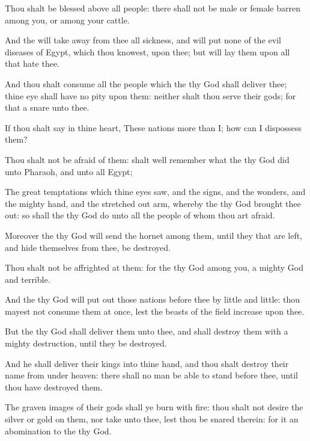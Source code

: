 {Thou shalt be
blessed above all
people: there shall not be
male or female
barren among you, or among your
cattle.

And the
{} will take
away from thee all
sickness, and will
put none of the
evil
diseases of
Egypt, which thou
knowest, upon thee; but will
lay them upon all
{} that
hate thee.

And thou shalt
consume all the
people which the
{} thy
God shall
deliver thee; thine
eye shall have no
pity upon them: neither shalt thou
serve their
gods; for that
{} a
snare unto thee.

If thou shalt
say in thine
heart, These
nations
{}
more than I;
how
can I
dispossess them?

Thou shalt not be
afraid of them:
{} shalt
well
remember what the
{} thy
God
did unto
Pharaoh, and unto all
Egypt;

The
great
temptations which thine
eyes
saw, and the
signs, and the
wonders, and the
mighty
hand, and the stretched
out
arm, whereby the
{} thy
God brought thee
out: so shall the
{} thy
God
do unto all the
people of whom thou art
afraid.

Moreover the
{} thy
God will
send the
hornet among them, until they that are
left, and
hide themselves
from thee, be
destroyed.

Thou shalt not be
affrighted
at them: for the
{} thy
God
{}
among you, a
mighty
God and
terrible.

And the
{} thy
God will put
out
those
nations
before thee by
little and
little: thou
mayest not
consume them at
once, lest the
beasts of the
field
increase upon thee.

But the
{} thy
God shall
deliver them unto
thee, and shall
destroy them with a
mighty
destruction, until they be
destroyed.

And he shall
deliver their
kings into thine
hand, and thou shalt
destroy their
name from under
heaven: there shall no
man be able to
stand
before thee, until thou have
destroyed them.

The graven
images of their
gods shall ye
burn with
fire: thou shalt not
desire the
silver or
gold
{} on them, nor
take
{} unto thee, lest thou be
snared therein: for it
{} an
abomination to the
{} thy
God.

}
